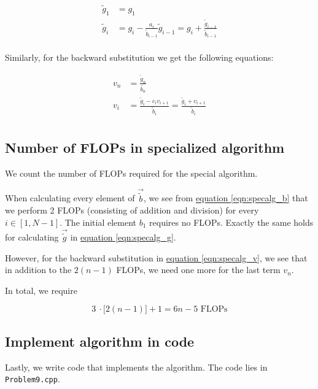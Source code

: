 \documentclass[english,notitlepage]{article}  %
\begin{document}
    \begin{equation}
      \begin{split}
        \tilde{g}_1 &= g_1 \\
        \tilde{g}_i &= g_i - \frac{a_i}{\tilde{b}_{i-1}} \tilde{g}_{i-1} = g_i + \frac{\tilde{g}_{i-1}}{\tilde{b}_{i-1}} \\ \label{eqn:specalg_g}
       \end{split}
    \end{equation}

    Similarly, for the backward substitution we get the following equations:

    \begin{equation}
      \begin{split}
        v_n &= \frac{\tilde{g}_n}{\tilde{b_n}} \\
        v_i &= \frac{\tilde{g}_i - c_i v_{i+1}}{\tilde{b}_i} = \frac{\tilde{g}_i + v_{i+1}}{\tilde{b}_i} \\ \label{eqn:specalg_v}
       \end{split}
    \end{equation}

  \subsection*{Number of FLOPs in specialized algorithm}

    We count the number of FLOPs required for the special algorithm.

    When calculating every element of $\vec{\tilde{b}}$, we see from \hyperref[eqn:specalg_b]{equation \ref*{eqn:specalg_b}}  that we perform 2 FLOPs (consisting of addition and division) for every $i \in [1, N-1]$. The initial element $b_1$ requires no FLOPs. Exactly the same holds for calculating $\vec{\tilde{g}}$ in \hyperref[eqn:specalg_g]{equation \ref*{eqn:specalg_g}}.

    However, for the backward substitution in \hyperref[eqn:specalg_v]{equation \ref*{eqn:specalg_v}}, we see that in addition to the $2(n-1)$ FLOPs, we need one more for the last term $v_n$.

    In total, we require

    \begin{equation}
      3 ~ \cdotp \big[ 2(n-1)\big] + 1 = 6n-5 \text{ FLOPs}
    \end{equation}

    \subsection*{Implement algorithm in code}

    Lastly, we write code that implements the algorithm. The code lies in \lstinline{Problem9.cpp}.
\end{document}
